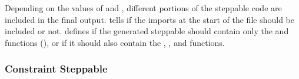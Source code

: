 Depending on the values of  and , different portions of the steppable code are included in the final output.  tells  if the imports at the start of the file should be included or not.  defines if the generated steppable should contain only the  and  functions (), or if it should also contain the , , and  functions.



\subsubsection{Constraint Steppable}\label{sec:trans:gen:step:const}




